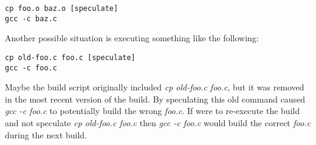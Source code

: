 \begin{verbatim}
cp foo.o baz.o [speculate]
gcc -c baz.c
\end{verbatim}

Another possible situation is \Rattle executing something like the following:

\begin{verbatim}
cp old-foo.c foo.c [speculate]
gcc -c foo.c
\end{verbatim}

Maybe the build script originally included \emph{cp old-foo.c foo.c}, but it was removed in the most recent version of the build.  By speculating this old command \Rattle caused \emph{gcc -c foo.c} to
potentially build the wrong \emph{foo.c}.  If \Rattle were to re-execute the build and not speculate \emph{cp old-foo.c foo.c} then \emph{gcc -c foo.c} would build the correct \emph{foo.c} during the next build.  %



